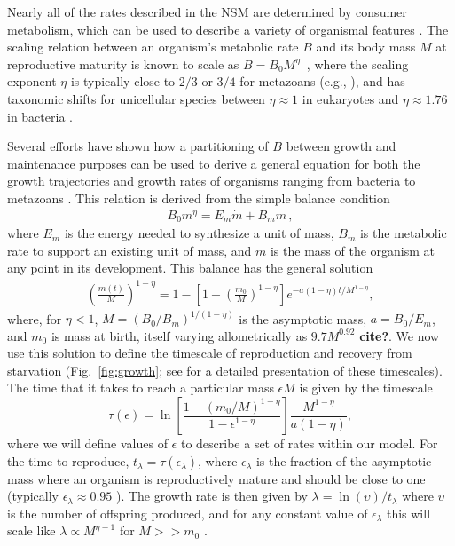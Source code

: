 \documentclass{pnastwo}
\begin{document}
\begin{article}
Nearly all of the rates described in the NSM are determined by consumer
metabolism, which can be used to describe a variety of organismal features
\cite{Brown:2004wq}.  The scaling relation between an organism's metabolic
rate $B$ and its body mass $M$ at reproductive maturity is known to scale as
$B = B_0 M^\eta$~\cite{West:2002it}, where the scaling exponent $\eta$ is
typically close to $2/3$ or $3/4$ for metazoans (e.g., \cite{Brown:2004wq}),
and has taxonomic shifts for unicellular species between $\eta\approx 1$ in
eukaryotes and $\eta\approx 1.76$ in bacteria
\cite{DeLong:2010dy,Kempes:2012hy}.

Several efforts have shown how a partitioning of $B$ between growth and
maintenance purposes can be used to derive a general equation for both the
growth trajectories and growth rates of organisms ranging from bacteria to
metazoans
\cite{West:2001bv,moses2008rmo,gillooly2002esa,hou,Kempes:2012hy}. This relation is derived from the simple balance condition \cite{West:2001bv,moses2008rmo,gillooly2002esa,hou,Kempes:2012hy}
\begin{eqnarray}
\label{balance}
B_{0}m^{\eta}=E_{m}\dot{m}+B_{m}m\,,
\end{eqnarray}
where $E_{m}$ is the energy needed to synthesize a unit of mass, $B_{m}$ is
the metabolic rate to support an existing unit of mass, and $m$ is the mass
of the organism at any point in its development.  This balance has the
general solution \cite{bettencourt,Kempes:2012hy}
\begin{eqnarray}
\label{m1}
\left(\frac{m\left(t\right)}{M}\right)^{1-\eta}\!=1\!-\!\left[1\!-\!\left(\frac{m_{0}}{M}\right)^{1\!-\!\eta}\right]e^{-a\left(1\!-\!\eta\right)t/M^{1-\eta}},
\end{eqnarray}
where, for $\eta<1$, $M=(B_{0}/B_{m})^{1/(1-\eta)}$ is the asymptotic mass, $a=B_{0}/E_{m}$, and $m_0$ is mass at birth, itself varying allometrically as $9.7M^{0.92}$ {\bf cite?}.  We now use this solution to define the timescale of reproduction and recovery from starvation (Fig.~\ref{fig:growth}; see \cite{moses2008rmo} for a detailed presentation of these timescales). The time that it takes to reach a particular mass $\epsilon M$ is given by the timescale
\begin{equation}
\label{t1}
\tau\left(\epsilon\right) = \ln\left[\frac{1-\left(m_{0}/M\right)^{1-\eta}}{1-\epsilon^{1-\eta}}\right]\frac{M^{1-\eta}}{a\left(1-\eta\right)},
\end{equation}
where we will define values of $\epsilon$ to describe a set of rates within our model. For the time to reproduce, $t_{\lambda}=\tau\left(\epsilon_{\lambda}\right)$, where $\epsilon_{\lambda}$ is the fraction of the asymptotic mass where an organism is reproductively mature and should be close to one (typically $\epsilon_{\lambda}\approx0.95$ \cite{West:2001bv}). The growth rate is then given by $\lambda=\ln\left(\upsilon\right)/t_{\lambda}$ where $\upsilon$ is the number of offspring produced, and for any constant value of $\epsilon_{\lambda}$ this will scale like $\lambda\propto M^{\eta-1}$ for $M>>m_{0}$ \cite{West:2001bv,moses2008rmo,gillooly2002esa,hou,Kempes:2012hy}.



\end{article}
\end{document}
